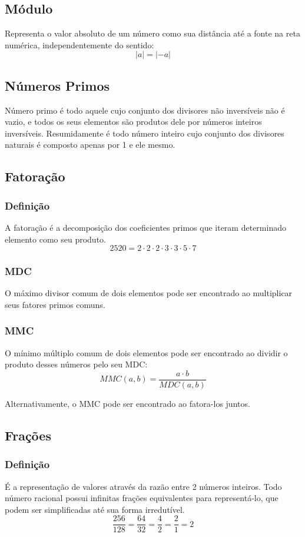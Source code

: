 \subsection{Módulo}
    Representa o valor absoluto de um número como sua distância até a fonte na reta numérica, independentemente do sentido:
    \[ |a| = |-a| \]
\subsection{Números Primos}
    Número primo é todo aquele cujo conjunto dos divisores não inversíveis não é vazio, e todos os seus elementos são produtos dele por números inteiros inversíveis. Resumidamente é todo número inteiro cujo conjunto dos divisores naturais é composto apenas por 1 e ele mesmo.
\subsection{Fatoração}
    \subsubsection{Definição}
        A fatoração é a decomposição dos coeficientes primos que iteram determinado elemento como seu produto. \eg
        \[ 2520 = 2 \cdot 2 \cdot 2 \cdot 3 \cdot 3 \cdot 5 \cdot 7 \]
    \subsubsection{MDC}
        O máximo divisor comum de dois elementos pode ser encontrado ao multiplicar seus fatores primos comuns.
    \subsubsection{MMC}
        O mínimo múltiplo comum de dois elementos pode ser encontrado ao dividir o produto desses números pelo seu MDC:
        \[ MMC(a,b) = \frac{a \cdot b}{MDC(a,b)} \]

        Alternativamente, o MMC pode ser encontrado ao fatora-los juntos. 
\subsection{Frações}
    \subsubsection{Definição}
        É a representação de valores através da razão entre 2 números inteiros. Todo número racional possui infinitas frações equivalentes para representá-lo, que podem ser simplificadas até sua forma irredutível. \eg
        \[ \frac{256}{128} = \frac{64}{32} = \frac{4}{2} = \frac{2}{1} = 2 \]
